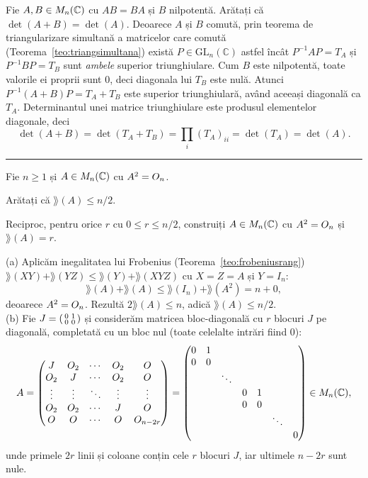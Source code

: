 Fie $A,B\in M_n(\mathbb{C})$ cu $AB=BA$ și $B$ nilpotentă. Arătați că $\det(A+B)=\det(A)$.
\sol Deoarece $A$ și $B$ comută, prin teorema de triangularizare simultană a matricelor care comută (Teorema~\ref{teo:triangsimultana}) există $P\in\mathrm{GL}_n(\mathbb{C})$ astfel încât $P^{-1}AP=T_A$ și $P^{-1}BP=T_B$ sunt \emph{ambele} superior triunghiulare. Cum $B$ este nilpotentă, toate valorile ei proprii sunt $0$, deci diagonala lui $T_B$ este nulă. Atunci $P^{-1}(A+B)P=T_A+T_B$ este superior triunghiulară, având aceeași diagonală ca $T_A$. Determinantul unei matrice triunghiulare este produsul elementelor diagonale, deci
\[ \det(A+B)=\det(T_A+T_B)=\prod_i (T_A)_{ii}=\det(T_A)=\det(A). \]
\vspace{1mm}\hrule

Fie $n\ge1$ și $A\in M_n(\mathbb{C})$ cu $A^2=O_n$.
\begin{parti}
  \item Arătați că $\rang(A)\le n/2$.
  \item Reciproc, pentru orice $r$ cu $0\le r\le n/2$, construiți $A\in M_n(\mathbb{C})$ cu $A^2=O_n$ și $\rang(A)=r$.
\end{parti}
\sol (a) Aplicăm inegalitatea lui Frobenius (Teorema~\ref{teo:frobeniusrang}) $\rang(XY)+\rang(YZ)\le\rang(Y)+\rang(XYZ)$ cu $X=Z=A$ și $Y=I_n$:
\[ \rang(A)+\rang(A)\le\rang(I_n)+\rang(A^2)=n+0, \]
deoarece $A^2=O_n$. Rezultă $2\rang(A)\le n$, adică $\rang(A)\le n/2$.\\[2pt]
(b) Fie $J=\begin{psmallmatrix}0&1\\0&0\end{psmallmatrix}$ și considerăm matricea bloc-diagonală cu $r$ blocuri $J$ pe diagonală, completată cu un bloc nul (toate celelalte intrări fiind $0$):
\[ A=\begin{pmatrix}
 J & O_2 & \cdots & O_2 & O\\
 O_2 & J & \cdots & O_2 & O\\
 \vdots & \vdots & \ddots & \vdots & \vdots\\
 O_2 & O_2 & \cdots & J & O\\
 O & O & \cdots & O & O_{n-2r}
\end{pmatrix}
=\begin{pmatrix}
 0&1& & & & & \\
 0&0& & & & & \\
  &  &\ddots& & & & \\
  &  & &0&1& & \\
  &  & &0&0& & \\
  &  & & & &\ddots& \\
  &  & & & & &0
\end{pmatrix}\in M_n(\mathbb{C}) , \]
unde primele $2r$ linii și coloane conțin cele $r$ blocuri $J$, iar ultimele $n-2r$ sunt nule.

